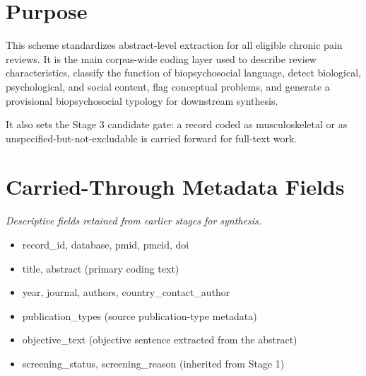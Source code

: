 \documentclass[11pt]{article}
\begin{document}
\section*{Purpose}
This scheme standardizes abstract-level extraction for all eligible chronic pain reviews. It is the main corpus-wide coding layer used to describe review characteristics, classify the function of biopsychosocial language, detect biological, psychological, and social content, flag conceptual problems, and generate a provisional biopsychosocial typology for downstream synthesis.

It also sets the Stage 3 candidate gate: a record coded as musculoskeletal or as unspecified-but-not-excludable is carried forward for full-text work.


\section*{Carried-Through Metadata Fields}
{\small\itshape Descriptive fields retained from earlier stages for synthesis.}\par\smallskip
\begin{itemize}
\item record\_id, database, pmid, pmcid, doi
\item title, abstract (primary coding text)
\item year, journal, authors, country\_contact\_author
\item publication\_types (source publication-type metadata)
\item objective\_text (objective sentence extracted from the abstract)
\item screening\_status, screening\_reason (inherited from Stage 1)
\end{itemize}
\end{document}
